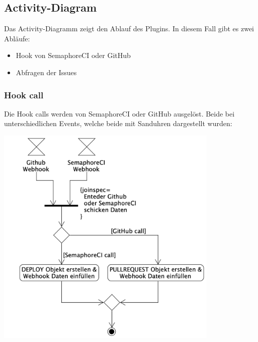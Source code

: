 \begin{minipage}{\textwidth}
  \subsection{Activity-Diagram}
  Das Activity-Diagramm zeigt den Ablauf des Plugins. In diesem Fall gibt es zwei Abläufe:
  \begin{itemize}
    \item Hook von SemaphoreCI oder GitHub
    \item Abfragen der Issues \newline
  \end{itemize}
\end{minipage}

\begin{minipage}{\textwidth}
  \subsubsection{Hook call}
  Die Hook calls werden von SemaphoreCI oder GitHub ausgelöst. Beide bei unterschiedlichen Events, welche beide mit Sanduhren
  dargestellt wurden:
  \begin{center}
    \includegraphics[width=0.8\textwidth]{images/activity/webhook.png}
    \label{fig:activity_hook_call}
  \end{center}
\end{minipage}

